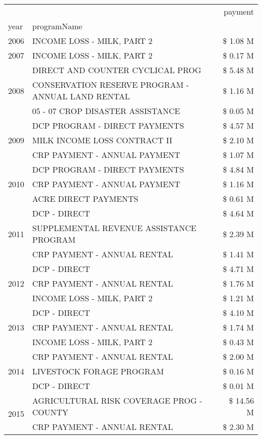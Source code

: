 \begin{tabular}{llr}
\toprule
 &  & payment \\
year & programName &  \\
\midrule
2006 & INCOME LOSS - MILK, PART 2 & \$ 1.08 M \\
\cline{1-3}
2007 & INCOME LOSS - MILK, PART 2 & \$ 0.17 M \\
\cline{1-3}
\multirow[t]{3}{*}{2008} & DIRECT AND COUNTER CYCLICAL PROG & \$ 5.48 M \\
 & CONSERVATION RESERVE PROGRAM - ANNUAL LAND RENTAL & \$ 1.16 M \\
 & 05 - 07 CROP DISASTER ASSISTANCE & \$ 0.05 M \\
\cline{1-3}
\multirow[t]{3}{*}{2009} & DCP PROGRAM - DIRECT PAYMENTS & \$ 4.57 M \\
 & MILK INCOME LOSS CONTRACT II & \$ 2.10 M \\
 & CRP PAYMENT - ANNUAL PAYMENT & \$ 1.07 M \\
\cline{1-3}
\multirow[t]{3}{*}{2010} & DCP PROGRAM - DIRECT PAYMENTS & \$ 4.84 M \\
 & CRP PAYMENT - ANNUAL PAYMENT & \$ 1.16 M \\
 & ACRE DIRECT PAYMENTS & \$ 0.61 M \\
\cline{1-3}
\multirow[t]{3}{*}{2011} & DCP - DIRECT & \$ 4.64 M \\
 & SUPPLEMENTAL REVENUE ASSISTANCE PROGRAM & \$ 2.39 M \\
 & CRP PAYMENT - ANNUAL RENTAL & \$ 1.41 M \\
\cline{1-3}
\multirow[t]{3}{*}{2012} & DCP - DIRECT & \$ 4.71 M \\
 & CRP PAYMENT - ANNUAL RENTAL & \$ 1.76 M \\
 & INCOME LOSS - MILK, PART 2 & \$ 1.21 M \\
\cline{1-3}
\multirow[t]{3}{*}{2013} & DCP - DIRECT & \$ 4.10 M \\
 & CRP PAYMENT - ANNUAL RENTAL & \$ 1.74 M \\
 & INCOME LOSS - MILK, PART 2 & \$ 0.43 M \\
\cline{1-3}
\multirow[t]{3}{*}{2014} & CRP PAYMENT - ANNUAL RENTAL & \$ 2.00 M \\
 & LIVESTOCK FORAGE PROGRAM & \$ 0.16 M \\
 & DCP - DIRECT & \$ 0.01 M \\
\cline{1-3}
\multirow[t]{3}{*}{2015} & AGRICULTURAL RISK COVERAGE PROG - COUNTY & \$ 14.56 M \\
 & CRP PAYMENT - ANNUAL RENTAL & \$ 2.30 M \\

\end{tabular}
